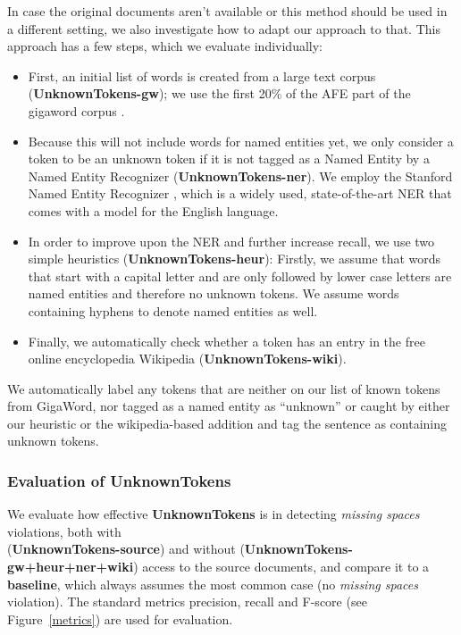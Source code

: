\documentclass[a4paper,10pt]{scrartcl}
\theoremstyle{style}
\begin{document}
In case the original documents aren't available or this method should be used in a different setting, we also investigate how to adapt our approach to that. This approach has a few steps, which we evaluate individually:

\begin{itemize}
\item First, an initial list of words is created from a large text corpus (\textbf{UnknownTokens-gw}); we use the first 20\% of the AFE part of the gigaword corpus \citep{gigaword}.

\item Because this will not include words for named entities yet, we only consider a token to be an unknown token if it is not tagged as a Named Entity by a Named Entity Recognizer (\textbf{UnknownTokens-ner}). We employ the Stanford Named Entity Recognizer \citep{stanfordNER}, which is a widely used, state-of-the-art NER that comes with a model for the English language.

\item In order to improve upon the NER and further increase recall, we use two simple heuristics (\textbf{UnknownTokens-heur}): Firstly, we assume that words that start with a capital letter and are only followed by lower case letters are named entities and therefore no unknown tokens. We assume words containing hyphens to denote named entities as well. 

\item Finally, we automatically check whether a token has an entry in the free online encyclopedia Wikipedia (\textbf{UnknownTokens-wiki}).

\end{itemize}

We automatically label any tokens that are neither on our list of known tokens from GigaWord, nor tagged as a named entity as ``unknown'' or caught by either our heuristic or the wikipedia-based addition and tag the sentence as containing unknown tokens.

\subsubsection{Evaluation of UnknownTokens}
We evaluate how effective \textbf{UnknownTokens} is in detecting \textit{missing spaces} violations, both with\\ (\textbf{UnknownTokens-source}) and without (\textbf{UnknownTokens-gw+heur+ner+wiki}) access to the source documents, and compare it to a \textbf{baseline}, which always assumes the most common case (no \textit{missing spaces} violation).
The standard metrics precision, recall and F-score (see Figure~\ref{metrics}) are used for evaluation.
\end{document}
